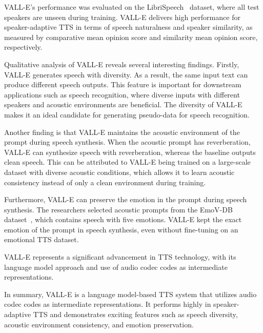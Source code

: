 VALL-E's performance was evaluated on the LibriSpeech~\cite{panayotov_librispeech_2015} dataset, where all test speakers are unseen during training. VALL-E delivers high performance for speaker-adaptive \ac{TTS} in terms of speech naturalness and speaker similarity, as measured by comparative mean opinion score and similarity mean opinion score, respectively.

Qualitative analysis of VALL-E reveals several interesting findings. Firstly, VALL-E generates speech with diversity. As a result, the same input text can produce different speech outputs. This feature is important for downstream applications such as speech recognition, where diverse inputs with different speakers and acoustic environments are beneficial. The diversity of VALL-E makes it an ideal candidate for generating pseudo-data for speech recognition.

Another finding is that VALL-E maintains the acoustic environment of the prompt during speech synthesis. When the acoustic prompt has reverberation, VALL-E can synthesize speech with reverberation, whereas the baseline outputs clean speech. This can be attributed to VALL-E being trained on a large-scale dataset with diverse acoustic conditions, which allows it to learn acoustic consistency instead of only a clean environment during training.

Furthermore, VALL-E can preserve the emotion in the prompt during speech synthesis. The researchers selected acoustic prompts from the EmoV-DB dataset~\cite{adigwe_emotional_2018}, which contains speech with five emotions. VALL-E kept the exact emotion of the prompt in speech synthesis, even without fine-tuning on an emotional \ac{TTS} dataset.

VALL-E represents a significant advancement in \ac{TTS} technology, with its language model approach and use of audio codec codes as intermediate representations.

In summary, VALL-E is a language model-based \ac{TTS} system that utilizes audio codec codes as intermediate representations. It performs highly in speaker-adaptive \ac{TTS} and demonstrates exciting features such as speech diversity, acoustic environment consistency, and emotion preservation.